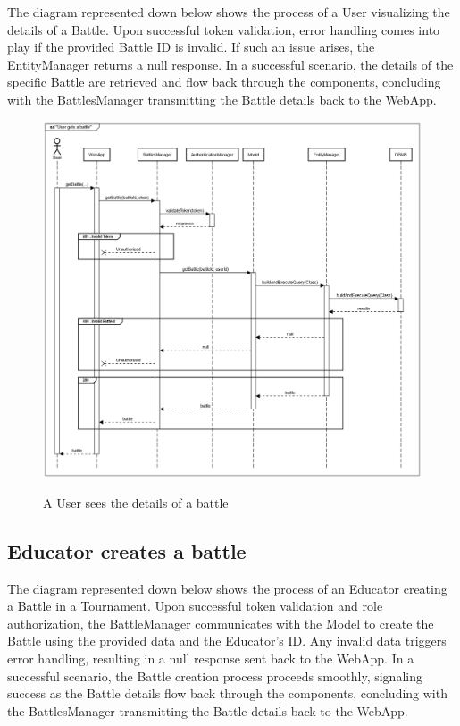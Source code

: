 \documentclass{Configuration_Files/Template}
\begin{document}
The diagram represented down below shows the process of a User visualizing the details of a Battle. Upon successful token validation, error handling comes into play if the provided Battle ID is invalid. If such an issue arises, the EntityManager returns a null response. In a successful scenario, the details of the specific Battle are retrieved and flow back through the components, concluding with the BattlesManager transmitting the Battle details back to the WebApp.

\begin{figure}[H]
\centering
\includegraphics[scale = 0.33]{Images/diagrams/sequences/GetBattle.png}\\
\caption{A User sees the details of a battle}
\end{figure}

\subsection{Educator creates a battle}

The diagram represented down below shows the process of an Educator creating a Battle in a Tournament. Upon successful token validation and role authorization, the BattleManager communicates with the Model to create the Battle using the provided data and the Educator's ID. Any invalid data triggers error handling, resulting in a null response sent back to the WebApp. In a successful scenario, the Battle creation process proceeds smoothly, signaling success as the Battle details flow back through the components, concluding with the BattlesManager transmitting the Battle details back to the WebApp.
\end{document}
